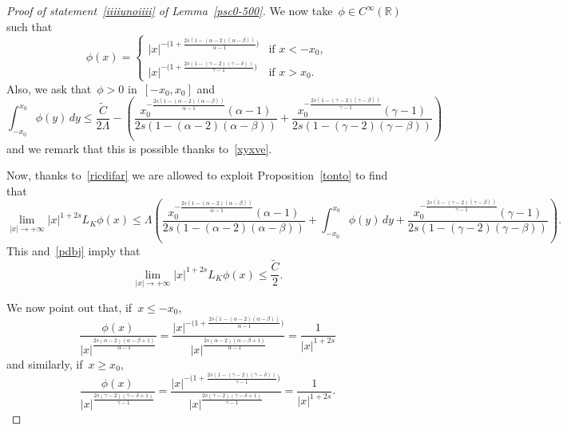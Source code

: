 \documentclass[10pt,a4paper]{amsart}
\numberwithin{equation}{section}
\newcommand{\R}{\mathbb{R}}
\begin{document}
\begin{proof}[Proof of statement~\eqref{iiiiunoiiii} of Lemma~\ref{psc0-500}]
We now take~$\phi \in C^{\infty}(\R)$ such that
\begin{equation}\label{vfurejmbheGFTYSTRDFKFGJ0987654}
\phi(x) =
\begin{cases}
|x |^{-\big(1+\frac{2s\left(1-(\alpha-2)(\alpha-\beta)\right)}{\alpha-1}\big)} &\mbox{if } x<-x_0,\\
|x|^{-\big(1+\frac{2s\left(1-(\gamma-2)(\gamma-\delta)\right)}{\gamma-1}\big)}&\mbox{if } x>x_0.
\end{cases}
\end{equation}
Also, we ask that~$\phi >0$ in~$[-x_0,x_0]$ and
\begin{equation}\label{pdbj}
\int_{-x_0}^{x_0}\phi(y) \, dy \leq \frac{\widetilde{C}}{2\Lambda} - \left( \frac{x_0^{-\frac{2s\left(1-(\alpha-2)(\alpha-\beta)\right)}{\alpha-1}}(\alpha-1)}{2s\left(1-(\alpha-2)(\alpha-\beta)\right)} +\frac{x_0^{-\frac{2s\left(1-(\gamma-2)(\gamma-\beta)\right)}{\gamma-1}}(\gamma-1)}{2s\left(1-(\gamma-2)(\gamma-\beta)\right)}\right)
\end{equation}
and we remark that this is possible thanks to~\eqref{xyxve}.

Now, thanks to~\eqref{ricdifar} we are allowed to exploit Proposition~\ref{tonto} to find that
\begin{equation*}
\lim_{|x | \to  +\infty} |x|^{1+2s} {L}_K\phi(x) \leq \Lambda \left( \frac{x_0^{-\frac{2s\left(1-(\alpha-2)(\alpha-\beta)\right)}{\alpha-1}}(\alpha-1)}{2s\left(1-(\alpha-2)(\alpha-\beta)\right)} + \int_{-x_0}^{x_0} \phi(y) \, dy
+\frac{x_0^{-\frac{2s\left(1-(\gamma-2)(\gamma-\beta)\right)}{\gamma-1}}(\gamma-1)}{2s\left(1-(\gamma-2)(\gamma-\beta)\right)}\right).
\end{equation*}
This and~\eqref{pdbj} imply that
\begin{equation*}
\lim_{|x | \to +\infty}| x |^{1+2s}{L}_K \phi (x) \leq \frac{\widetilde{C}}{2}.
\end{equation*}

We now point out that, if~$x\le -x_0$,
\begin{equation*}
\frac{\phi(x)}{|x |^{\frac{2s(\alpha -2)(\alpha-\beta+1)}{\alpha-1}}}=\frac{|x |^{-\big(1+\frac{2s\left(1-(\alpha-2)(\alpha-\beta)\right)}{\alpha-1}\big)}}{|x |^{\frac{2s(\alpha -2)(\alpha-\beta+1)}{\alpha-1}}}=\frac1{|x|^{1+2s}}
\end{equation*}
and similarly, if~$x\ge x_0$,
\begin{equation*}
\frac{\phi(x)}{|x |^{\frac{2s(\gamma -2)(\gamma-\delta+1)}{\gamma-1}}}=\frac{|x |^{-\big(1+\frac{2s\left(1-(\gamma-2)(\gamma-\delta)\right)}{\gamma-1}\big)}}{|x |^{\frac{2s(\gamma -2)(\gamma-\delta+1)}{\gamma-1}}}=\frac1{|x|^{1+2s}}.
\end{equation*}


\end{proof}
\end{document}
